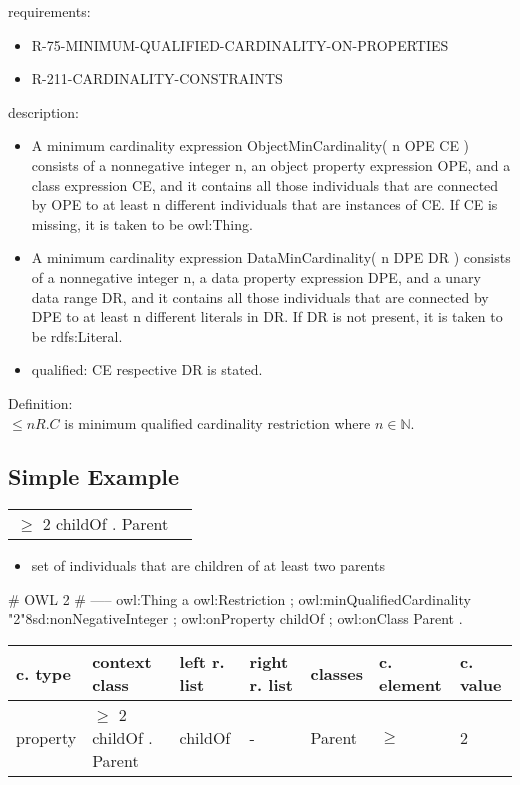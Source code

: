 \documentclass{llncs}
\newenvironment{gcotable}{
  \scriptsize
  \sffamily
  \vspace{0.3cm}
	\begin{center}
  \begin{tabular}{l|l|l|l|l|l|l}
  \hline
  \textbf{c. type} & \textbf{context class} & \textbf{left r. list} & \textbf{right r. list} & \textbf{classes} & \textbf{c. element} & \textbf{c. value} \\
  \hline

}{
  \hline
  \end{tabular}
	\end{center}
}
\newenvironment{DL}{
	\begin{center}
  \begin{tabular}{r l}

}{
  \end{tabular}
	\end{center}
}
\begin{document}
requirements:

\begin{itemize}
	\item R-75-MINIMUM-QUALIFIED-CARDINALITY-ON-PROPERTIES
  \item R-211-CARDINALITY-CONSTRAINTS
\end{itemize}

description:

\begin{itemize}
	\item A minimum cardinality expression ObjectMinCardinality( n OPE CE ) consists of a nonnegative integer n, an object property expression OPE, and a class expression CE, and it contains all those individuals that are connected by OPE to at least n different individuals that are instances of CE. If CE is missing, it is taken to be owl:Thing.
	\item A minimum cardinality expression DataMinCardinality( n DPE DR ) consists of a nonnegative integer n, a data property expression DPE, and a unary data range DR, and it contains all those individuals that are connected by DPE to at least n different literals in DR. If DR is not present, it is taken to be rdfs:Literal. 
	\item qualified: CE respective DR is stated.
\end{itemize}
Definition:\\

$\leq n R. C$ is minimum qualified cardinality restriction where $n \in \mathbb{N}$.

\subsection{Simple Example}

\begin{DL}
$\geq$ 2 childOf . Parent
\end{DL}

\begin{itemize}
	\item set of individuals that are children of at least two parents
\end{itemize}

\begin{ex}
# OWL 2
# -----
owl:Thing
    a owl:Restriction ;
    owl:minQualifiedCardinality "2"^^xsd:nonNegativeInteger ;
    owl:onProperty childOf ;
    owl:onClass Parent .
\end{ex}

\begin{gcotable}
property & $\geq$ 2 childOf . Parent & childOf & -  & Parent & $\geq$ & 2 \\
\end{gcotable}
\end{document}
